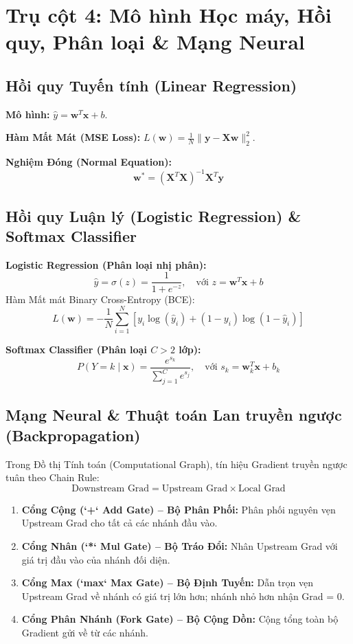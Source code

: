 \documentclass[11pt,a4paper]{article}
\begin{document}
\newpage
\section{Trụ cột 4: Mô hình Học máy, Hồi quy, Phân loại \& Mạng Neural}

\subsection{Hồi quy Tuyến tính (Linear Regression)}
\textbf{Mô hình:} $\hat{y} = \mathbf{w}^T \mathbf{x} + b$.

\textbf{Hàm Mất Mát (MSE Loss):} $L(\mathbf{w}) = \frac{1}{N} \|\mathbf{y} - \mathbf{X}\mathbf{w}\|_2^2$.

\textbf{Nghiệm Đóng (Normal Equation):}
$$\mathbf{w}^* = (\mathbf{X}^T \mathbf{X})^{-1} \mathbf{X}^T \mathbf{y}$$

\subsection{Hồi quy Luận lý (Logistic Regression) \& Softmax Classifier}
\textbf{Logistic Regression (Phân loại nhị phân):}
$$\hat{y} = \sigma(z) = \frac{1}{1 + e^{-z}}, \quad \text{với } z = \mathbf{w}^T \mathbf{x} + b$$
Hàm Mất mát Binary Cross-Entropy (BCE):
$$L(\mathbf{w}) = -\frac{1}{N} \sum_{i=1}^N \left[ y_i \log(\hat{y}_i) + (1 - y_i) \log(1 - \hat{y}_i) \right]$$

\textbf{Softmax Classifier (Phân loại $C > 2$ lớp):}
$$P(Y = k \mid \mathbf{x}) = \frac{e^{s_k}}{\sum_{j=1}^C e^{s_j}}, \quad \text{với } s_k = \mathbf{w}_k^T \mathbf{x} + b_k$$

\subsection{Mạng Neural \& Thuật toán Lan truyền ngược (Backpropagation)}

\begin{mindsetbox}
Trong Đồ thị Tính toán (Computational Graph), tín hiệu Gradient truyền ngược tuân theo Chain Rule:
$$\text{Downstream Grad} = \text{Upstream Grad} \times \text{Local Grad}$$
\begin{enumerate}
    \item \textbf{Cổng Cộng (`+` Add Gate) -- Bộ Phân Phối:} Phân phối nguyên vẹn Upstream Grad cho tất cả các nhánh đầu vào.
    \item \textbf{Cổng Nhân (`*` Mul Gate) -- Bộ Tráo Đổi:} Nhân Upstream Grad với giá trị đầu vào của nhánh đối diện.
    \item \textbf{Cổng Max (`max` Max Gate) -- Bộ Định Tuyến:} Dẫn trọn vẹn Upstream Grad về nhánh có giá trị lớn hơn; nhánh nhỏ hơn nhận Grad = 0.
    \item \textbf{Cổng Phân Nhánh (Fork Gate) -- Bộ Cộng Dồn:} Cộng tổng toàn bộ Gradient gửi về từ các nhánh.
\end{enumerate}
\end{mindsetbox}
\end{document}
